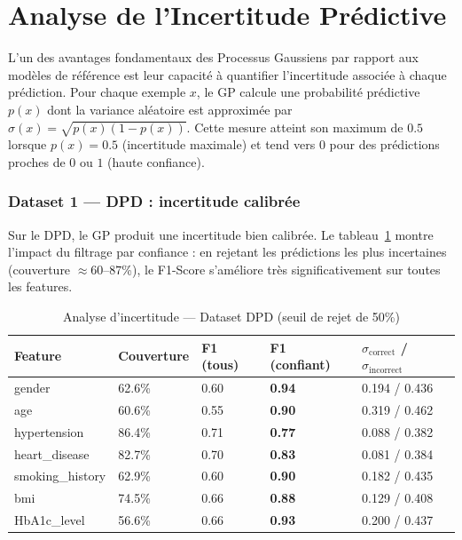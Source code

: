\documentclass[12pt,a4paper]{article}
\begin{document}

\section{Analyse de l'Incertitude Prédictive}
\label{sec:uncertainty}

L'un des avantages fondamentaux des Processus Gaussiens par rapport aux modèles de référence est leur capacité à quantifier l'incertitude associée à chaque prédiction. Pour chaque exemple $x$, le GP calcule une probabilité prédictive $p(x)$ dont la variance aléatoire est approximée par $\sigma(x) = \sqrt{p(x)(1-p(x))}$. Cette mesure atteint son maximum de $0.5$ lorsque $p(x) = 0.5$ (incertitude maximale) et tend vers $0$ pour des prédictions proches de $0$ ou $1$ (haute confiance).

\subsubsection*{Dataset 1 — DPD : incertitude calibrée}

Sur le DPD, le GP produit une incertitude bien calibrée. Le tableau~\ref{tab:uncertainty_dpd} montre l'impact du filtrage par confiance : en rejetant les prédictions les plus incertaines (couverture $\approx 60$--$87$\%), le F1-Score s'améliore très significativement sur toutes les features.

\begin{table}[H]
\centering
\caption{Analyse d'incertitude — Dataset DPD (seuil de rejet de 50\%)}
\label{tab:uncertainty_dpd}
\small
\begin{tabular}{p{3.2cm}p{1.8cm}p{1.8cm}p{1.8cm}p{2.5cm}}
\hline
\textbf{Feature} & \textbf{Couverture} & \textbf{F1 (tous)} & \textbf{F1 (confiant)} & \textbf{$\sigma_{\text{correct}}$ / $\sigma_{\text{incorrect}}$} \\
\hline
gender           & 62.6\% & 0.60 & \textbf{0.94} & 0.194 / 0.436 \\
age              & 60.6\% & 0.55 & \textbf{0.90} & 0.319 / 0.462 \\
hypertension     & 86.4\% & 0.71 & \textbf{0.77} & 0.088 / 0.382 \\
heart\_disease    & 82.7\% & 0.70 & \textbf{0.83} & 0.081 / 0.384 \\
smoking\_history & 62.9\% & 0.60 & \textbf{0.90} & 0.182 / 0.435 \\
bmi              & 74.5\% & 0.66 & \textbf{0.88} & 0.129 / 0.408 \\
HbA1c\_level     & 56.6\% & 0.66 & \textbf{0.93} & 0.200 / 0.437 \\
\hline
\end{tabular}
\end{table}
\end{document}

